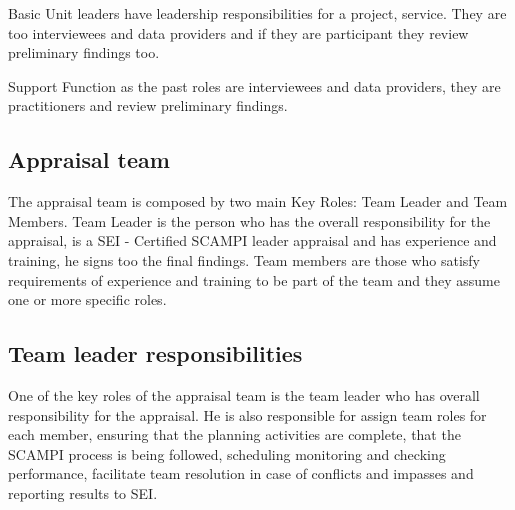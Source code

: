 Basic Unit leaders have leadership responsibilities for a project, service. They are too interviewees and data providers and if they are participant they review preliminary findings too.

Support Function as the past roles are interviewees and data providers, they are practitioners and review preliminary findings.

\subsection{Appraisal team}

The appraisal team is composed by two main Key Roles: Team Leader and Team Members.
Team Leader is the person who has the overall responsibility for the appraisal, is a SEI - Certified SCAMPI\citep{SCAMPITeam2013} leader appraisal and has experience and training, he signs too the final findings.
Team members are those who satisfy requirements of  experience and training to be part of the team and they assume one or more specific roles.

\subsection{Team leader responsibilities}

One of the key roles of the appraisal team is the team leader who has overall responsibility for the appraisal. He is also responsible for assign team roles for each member, ensuring that the planning activities are complete, that the SCAMPI process is being followed, scheduling monitoring and checking performance, facilitate team resolution in case of conflicts and impasses and reporting results to SEI.

